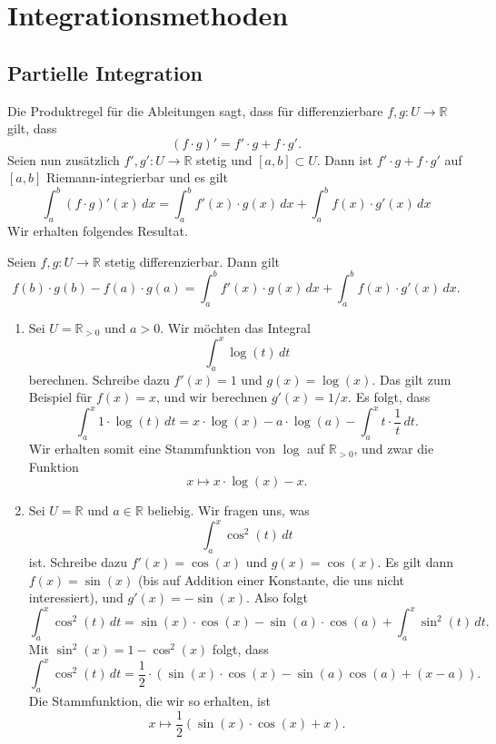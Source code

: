 \documentclass[../main.tex]{subfiles}
\begin{document}
\section{Integrationsmethoden}
\subsection*{Partielle Integration}
Die Produktregel für die Ableitungen sagt, dass für
differenzierbare $f, g \colon U \to \mathbb{R}$ gilt, dass
\[
  (f\cdot g)' = f'\cdot g + f\cdot g'.
\]
Seien nun zusätzlich $f', g' \colon U \to \mathbb{R}$ stetig
und $[a, b] \subset U$. Dann ist $f' \cdot g + f \cdot g'$
auf $[a, b]$ Riemann-integrierbar und es gilt
\[
  \int_{a}^{b} (f \cdot g)' (x) \, dx
  = \int_{a}^{b} f'(x) \cdot g(x) \, dx
  + \int_{a}^{b} f(x) \cdot g'(x) \, dx
\]
Wir erhalten folgendes Resultat.

\begin{byparts}
  Seien $f, g \colon U \to \mathbb{R}$ stetig differenzierbar.
  Dann gilt
  \[
    f(b) \cdot g(b) - f(a) \cdot g(a)
    = \int_{a}^{b} f'(x) \cdot g(x) \, dx
    + \int_{a}^{b} f(x) \cdot g'(x) \, dx.
  \]
\end{byparts}

\begin{examples}
  \leavevmode
  \begin{enumerate}[(1)]
    \item Sei $U = \mathbb{R}_{>0}$ und $a  > 0$.
      Wir möchten das Integral
      \[
        \int_{a}^{x} \log(t) \, dt
      \]
      berechnen. Schreibe dazu
      $f'(x) = 1$ und $g(x) = \log (x)$.
      Das gilt zum Beispiel für $f(x) = x$,
      und wir berechnen $g'(x) = 1/x$.
      Es folgt, dass
      \[
        \int_{a}^{x} 1 \cdot \log(t) \, dt
        = x \cdot \log (x) - a \cdot \log (a)
        - \int_{a}^{x} t \cdot \frac{1}{t} \, dt.
      \]
      Wir erhalten somit eine Stammfunktion von $\log$
      auf $\mathbb{R}_{>0}$, und zwar die Funktion
      \[
        x \mapsto x \cdot \log(x) - x.
      \]
    \item Sei $U = \mathbb{R}$ und $a \in \mathbb{R}$ beliebig.
      Wir fragen uns, was
      \[
        \int_{a}^{x} \cos^2(t) \, dt
      \]
      ist. Schreibe dazu $f'(x) = \cos (x)$
      und $g(x) = \cos(x)$.
      Es gilt dann
      $f(x) = \sin(x)$ (bis auf Addition einer Konstante,
      die uns nicht interessiert), und $g'(x) = -\sin(x)$.
      Also folgt
      \[
        \int_{a}^{x} \cos^2(t) \, dt
        = \sin(x) \cdot \cos (x) -
        \sin(a) \cdot \cos (a) +
        \int_{a}^{x} \sin^2(t) \, dt.
      \]
      Mit $\sin^2(x) = 1 - \cos^2(x)$ folgt, dass
      \[
        \int_{a}^{x} \cos^2(t) \, dt
        = \frac{1}{2} \cdot
        \left( \sin(x) \cdot \cos(x) -
        \sin(a) \cos (a) + (x-a) \right).
      \]
      Die Stammfunktion, die wir so erhalten, ist
      \[
        x \mapsto \frac{1}{2} (\sin (x) \cdot \cos(x) + x).
      \]
  \end{enumerate}
\end{examples}
\end{document}
